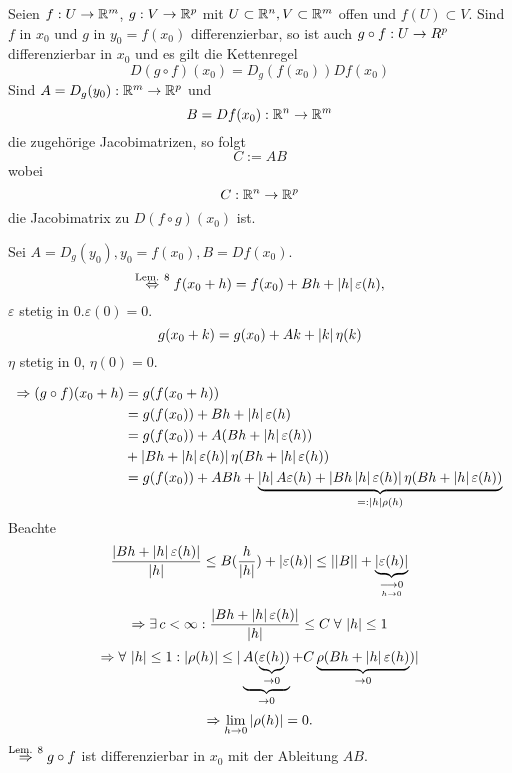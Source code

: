 \documentclass[../ana2.tex]{subfiles}
\begin{document}
\begin{satz}[Kettenregel]
    Seien \( f:U\rightarrow \mathbb{R}^m \), 
    \( g:V\rightarrow \mathbb{R}^p \)
    mit \( U \subset \mathbb{R}^n, V \subset \mathbb{R}^m \)
    offen und \( f(U) \subset V \).
    Sind \(f\) in \(x_0\) und \(g\) in \(y_0 = f(x_0)\)
    differenzierbar, so ist auch \(g \circ f:U\rightarrow R^p\)
    differenzierbar in \(x_0\) und es gilt die 
    Kettenregel 
    \[ D(g\circ f)(x_0) = D_g(f(x_0))Df(x_0) \]
    Sind \( A = D_g(y_0):\mathbb{R}^m\rightarrow \mathbb{R}^p \) und 
    \[ B = Df(x_0):\mathbb{R}^n\rightarrow \mathbb{R}^m \]
    die zugehörige Jacobimatrizen, so folgt 
    \[ C := AB \]
    wobei
    \[ C:\mathbb{R}^n\rightarrow \mathbb{R}^p \] 
    die Jacobimatrix zu \( D(f \circ g)(x_0) \) ist.
\end{satz}
\begin{bew}
    Sei \(A = D_g(y_0), y_0 = f(x_0), B = Df(x_0) \).
    \[ \overset{\text{Lem. 8}}{\Leftrightarrow} 
    f(x_0 + h) = f(x_0) + Bh + \left|h\right| \varepsilon(h), \]
    \( \varepsilon \) stetig in \(0. \varepsilon(0) = 0\).
    \[ g(x_0 + k) = g(x_0) + Ak + \left|k\right| \eta(k) \]
    \( \eta \) stetig in \( 0 \), \( \eta(0) = 0 \).

    \begin{align*}
        \Rightarrow (g \circ f)(x_0 + h) &= g(f(x_0 + h))\\
        &= g(f(x_0)) + Bh + \left|h\right|\varepsilon(h) \\
        &= g(f(x_0)) + A(Bh + \left|h\right|\varepsilon(h)) \\
        &+ \left| Bh + \left|h\right|\varepsilon(h) \right| \eta (Bh + \left|h\right|\varepsilon(h)) \\
        &= g(f(x_0)) + ABh + \underbrace{\left|h\right| A \varepsilon(h) + \left|Bh \left|h\right|\varepsilon(h)\right| \eta (Bh + \left|h\right|\varepsilon(h))}_{=:\left|h\right|\rho(h)}
    \end{align*}
    Beachte 
    \[ \frac{\left| Bh + \left|h\right|\varepsilon(h) \right|}{\left|h\right|} 
    \leq B(\frac{h}{\left|h\right|}) + \left|\varepsilon(h)\right| 
    \leq \left|\left|B\right|\right| + \underbrace{\left|\varepsilon(h)\right|}_{\underset{h \rightarrow 0}{\longrightarrow 0}} \]
    \[ \Rightarrow \exists c < \infty: \frac{\abs{Bh + \abs{h}\varepsilon(h)}}{\abs{h}} 
    \leq C \; \forall \abs{h} \leq 1 \]
    \[ \Rightarrow \forall \abs{h} \leq 1: 
    \abs{\rho(h)} \leq | \underbrace{A(\underbrace{\varepsilon(h)}_{\rightarrow 0})}_{\rightarrow 0} 
    + C\underbrace{\rho (Bh + \abs{h}\varepsilon(h)}_{\rightarrow 0}) | \]    
    \[ \Rightarrow \lim\limits_{h\rightarrow{}0} \left|\rho(h)\right| = 0. \]
    \( \overset{\text{Lem. 8}}{\Rightarrow} g \circ f \) 
    ist differenzierbar in \(x_0\) mit der Ableitung \( AB \).
\end{bew}
\end{document}
